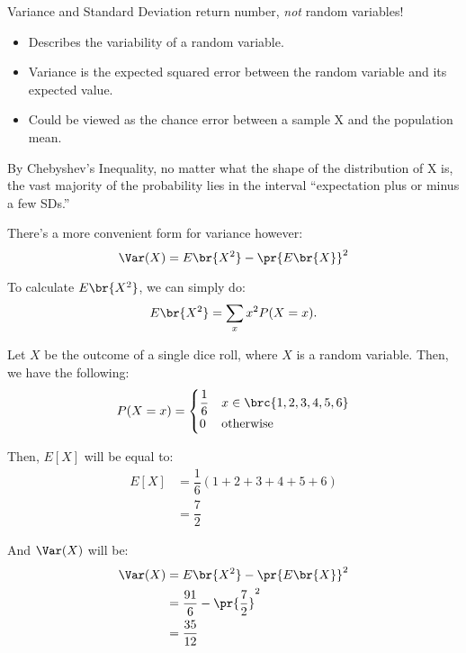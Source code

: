 \documentclass[openany]{book}
\begin{document}
\begin{warn}
	Variance and Standard Deviation return number, \textit{not} random variables!
	\begin{itemize}
		\item Describes the variability of a random variable.
		\item Variance is the expected squared error  between the random variable and its expected value.
		\item Could be viewed as the chance error between a sample X and the population mean.
	\end{itemize}
\end{warn}

\begin{rmk}
	By Chebyshev's Inequality, no matter what the shape of the distribution of X is, the vast majority of the probability lies in the interval “expectation plus or minus a few SDs.”
\end{rmk}

There's a more convenient form for variance however:
\begin{equation*}
	\Var(X) = E\br{X^{2}} - \pr{E\br{X}}^{2}
\end{equation*}

To calculate $E\br{X^{2}}$, we can simply do:
\begin{equation*}
	E\br{X^{2}} = \sum_x x^{2} P(X=x).
\end{equation*}

\begin{example}
	Let $X$ be the outcome of a single dice roll, where $X$ is a random variable. Then, we have the following:
	\begin{align*}
		P(X=x) = \begin{cases}
				\dfrac{1}{6} & x \in \brc{1,2,3,4,5,6} \\
				0 & \text{otherwise}
			\end{cases}
	\end{align*}

	Then, $E[X]$ will be equal to:
	\begin{align*}
		E[X] &= \dfrac{1}{6}(1+2+3+4+5+6) \\
		&= \dfrac{7}{2}
	\end{align*}

	And $\Var(X)$ will be:
	\begin{align*}
		\Var(X) &= E\br{X^{2}} - \pr{E\br{X}}^{2} \\
		&= \dfrac{91}{6} - \pr{\dfrac{7}{2}}^{2} \\
		&= \dfrac{35}{12}
	\end{align*}
\end{example}
\end{document}

